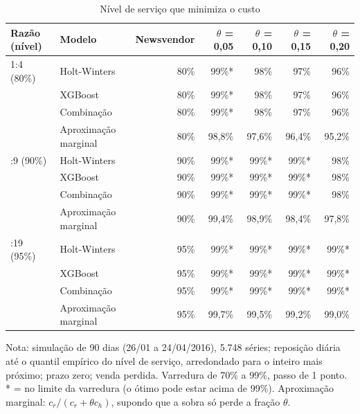 \begin{table}[htbp]
\centering
\small
\caption{Nível de serviço que minimiza o custo}
\label{tab:sim_nivel_otimo}
\begin{tabular}{llrrrrr}
\toprule
Razão (nível) & Modelo & Newsvendor & $\theta$ = 0,05 & $\theta$ = 0,10 & $\theta$ = 0,15 & $\theta$ = 0,20 \\
\midrule
1:4 (80\%) & Holt-Winters & 80\% & 99\%* & 98\% & 97\% & 96\% \\
 & XGBoost & 80\% & 99\%* & 98\% & 97\% & 96\% \\
 & Combinação & 80\% & 99\%* & 98\% & 97\% & 96\% \\
 & Aproximação marginal & 80\% & 98,8\% & 97,6\% & 96,4\% & 95,2\% \\
\addlinespace
1:9 (90\%) & Holt-Winters & 90\% & 99\%* & 99\%* & 99\%* & 98\% \\
 & XGBoost & 90\% & 99\%* & 99\%* & 99\%* & 98\% \\
 & Combinação & 90\% & 99\%* & 99\%* & 99\%* & 98\% \\
 & Aproximação marginal & 90\% & 99,4\% & 98,9\% & 98,4\% & 97,8\% \\
\addlinespace
1:19 (95\%) & Holt-Winters & 95\% & 99\%* & 99\%* & 99\%* & 99\%* \\
 & XGBoost & 95\% & 99\%* & 99\%* & 99\%* & 99\%* \\
 & Combinação & 95\% & 99\%* & 99\%* & 99\%* & 99\%* \\
 & Aproximação marginal & 95\% & 99,7\% & 99,5\% & 99,2\% & 99,0\% \\
\bottomrule
\end{tabular}
\par\smallskip
{\footnotesize Nota: simulação de 90 dias (26/01 a 24/04/2016), 5.748 séries; reposição diária até o quantil empírico do nível de serviço, arredondado para o inteiro mais próximo; prazo zero; venda perdida. Varredura de 70\% a 99\%, passo de 1 ponto. * = no limite da varredura (o ótimo pode estar acima de 99\%). Aproximação marginal: $c_r / (c_r + \theta c_h)$, supondo que a sobra só perde a fração $\theta$. }
\end{table}
